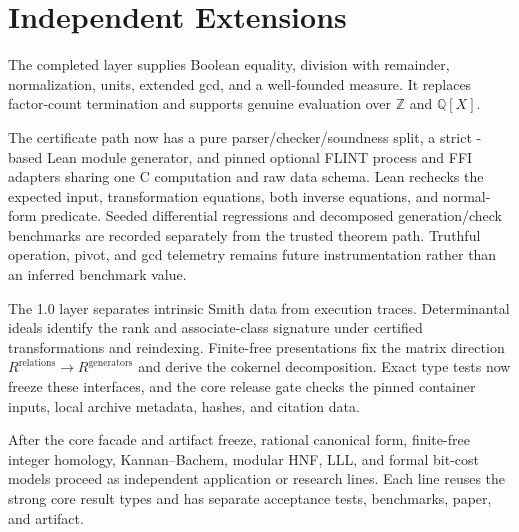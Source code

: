 \section{Independent Extensions}
\label{sec:future}

The completed  layer supplies Boolean equality,
division with remainder, normalization, units, extended gcd, and a
well-founded measure. It replaces factor-count termination and supports
genuine evaluation over \(\mathbb Z\) and \(\mathbb Q[X]\).

The certificate path now has a pure parser/checker/soundness split, a strict
-based Lean module generator, and pinned optional FLINT
process and FFI adapters sharing one C computation and raw data schema. Lean
rechecks the expected input, transformation equations, both inverse equations,
and normal-form predicate. Seeded differential regressions and decomposed
generation/check benchmarks are recorded separately from the trusted theorem
path. Truthful operation, pivot, and gcd telemetry remains future
instrumentation rather than an inferred benchmark value.

The 1.0 layer separates intrinsic Smith data from execution traces.
Determinantal ideals identify the rank and associate-class signature under
certified transformations and reindexing. Finite-free presentations fix the
matrix direction \(R^{\mathrm{relations}}\to R^{\mathrm{generators}}\) and
derive the cokernel decomposition. Exact type tests now freeze these
interfaces, and the core release gate checks the pinned container inputs,
local archive metadata, hashes, and citation data.

After the core facade and artifact freeze, rational canonical form, finite-free
integer homology, Kannan--Bachem, modular HNF, LLL, and formal bit-cost models
proceed as independent application or research lines. Each line reuses the
strong core result types and has separate acceptance tests, benchmarks, paper,
and artifact.

